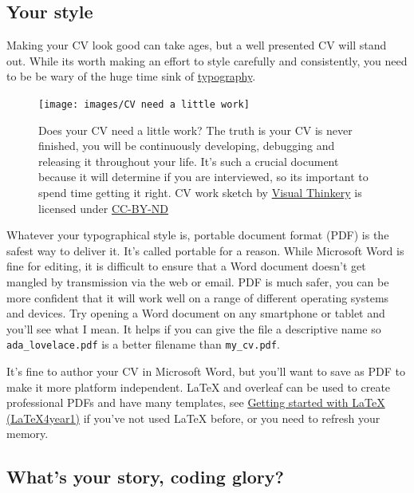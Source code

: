 \documentclass[
]{book}
\begin{document}
\hypertarget{pdf}{%
\subsection{Your style}\label{pdf}}

Making your CV look good can take ages, but a well presented CV will stand out. While its worth making an effort to style carefully and consistently, you need to be be wary of the huge time sink of \href{https://en.wikipedia.org/wiki/Typography}{typography}.

\begin{figure}

{\centering \texttt{[image: images/CV need a little work]} 

}

\caption{Does your CV need a little work? The truth is your CV is never finished, you will be continuously developing, debugging and releasing it throughout your life. It's such a crucial document because it will determine if you are interviewed, so its important to spend time getting it right. CV work sketch by \href{https://visualthinkery.com}{Visual Thinkery} is licensed under \href{https://creativecommons.org/licenses/by-nd/4.0/}{CC-BY-ND}}\label{fig:cvwork-fig}
\end{figure}



Whatever your typographical style is, portable document format (PDF) is the safest way to deliver it. It's called portable for a reason. While Microsoft Word is fine for editing, it is difficult to ensure that a Word document doesn't get mangled by transmission via the web or email. PDF is much safer, you can be more confident that it will work well on a range of different operating systems and devices. Try opening a Word document on any smartphone or tablet and you'll see what I mean. It helps if you can give the file a descriptive name so \texttt{ada\_lovelace.pdf} is a better filename than \texttt{my\_cv.pdf}.

It's fine to author your CV in Microsoft Word, but you'll want to save as PDF to make it more platform independent. LaTeX and overleaf can be used to create professional PDFs and have many templates, see \href{https://latex4year1.netlify.app/}{Getting started with LaTeX (LaTeX4year1)} if you've not used LaTeX before, or you need to refresh your memory. \citep{latex4year1}

\hypertarget{care}{%
\subsection{What's your story, coding glory?}\label{care}}
\end{document}
